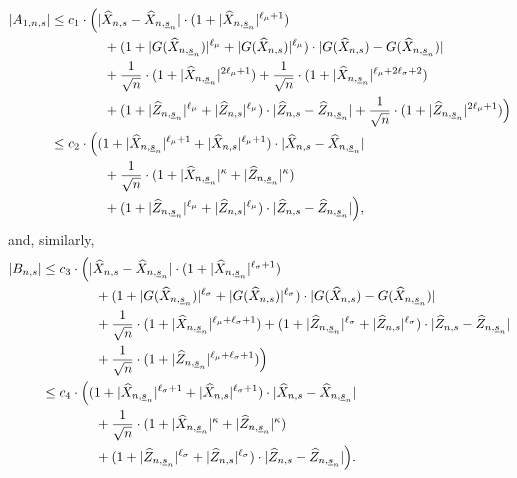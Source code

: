 \documentclass[11pt]{amsart}
\newcommand{\eul}{{\widehat X}}
\newcommand{\eultr}{{\widehat Z}}
\newcommand{\usn}{\underline {s}_n}
\theoremstyle{plain}
\theoremstyle{definition}
\begin{document}
\begin{equation}\label{ana3}
	\begin{aligned}
		|A_{1,n,s}| & \le c_1 \cdot \Bigl(|\eul_{n,s}- \eul_{n,\usn}| \cdot (1+ |\eul_{n,\usn}|^{\ell_\mu+1})\\
		&\qquad\qquad + (1+ |G(\eul_{n,\usn})|^{\ell_\mu}  + |G(\eul_{n,s})|^{\ell_\mu} )\cdot   |G(\eul_{n,s})- G(\eul_{n,\usn})| \\
				& \qquad\qquad + \frac{1}{\sqrt{n}}\cdot( 1+ |\widehat X_{n,\usn}|^{2\ell_\mu+1})  + \frac{1}{\sqrt{n}} \cdot( 1+ |\widehat X_{n,\usn}|^{\ell_\mu+2\ell_\sigma+2}) \\
					& \qquad\qquad +  (1+ |\eultr_{n,\usn}|^{\ell_\mu}  + |\eultr_{n,s}|^{\ell_\mu} )\cdot   |\eultr_{n,s}- \eultr_{n,\usn}|
		+ \frac{1}{\sqrt{n}} \cdot( 1+ |\widehat Z_{n,\usn}|^{2\ell_\mu+1})\Bigr)\\
			& \le c_2\cdot \Bigl((1+ |\eul_{n,\usn}|^{\ell_\mu+1}+ |\eul_{n,s}|^{\ell_\mu+1}   ) \cdot |\eul_{n,s}- \eul_{n,\usn}|  \\
		& \qquad\qquad +	\frac{1}{\sqrt{n}} \cdot( 1+ |\widehat X_{n,\usn}|^{\kappa } + |\widehat Z_{n,\usn}|^{\kappa} ) \\
		& \qquad\qquad +  (1+ |\eultr_{n,\usn}|^{\ell_\mu}  + |\eultr_{n,s}|^{\ell_\mu} )\cdot   |\eultr_{n,s}- \eultr_{n,\usn}| \Bigr),
	\end{aligned}
\end{equation}
and, similarly,
\begin{equation}\label{ana4}
	\begin{aligned}
		|B_{n,s}| & \le c_3 \cdot\Bigl(|\eul_{n,s}- \eul_{n,\usn}| \cdot (1+ |\eul_{n,\usn}|^{\ell_\sigma+1})\\
		&\qquad\qquad + (1+ |G(\eul_{n,\usn})|^{\ell_\sigma}  + |G(\eul_{n,s})|^{\ell_\sigma} )\cdot   |G(\eul_{n,s})- G(\eul_{n,\usn})| \\
		& \qquad\qquad + \frac{1}{\sqrt{n}} \cdot( 1+ |\widehat X_{n,\usn}|^{\ell_\mu + \ell_\sigma+1}) +  (1+ |\eultr_{n,\usn}|^{\ell_\sigma}  + |\eultr_{n,s}|^{\ell_\sigma} )\cdot   |\eultr_{n,s}- \eultr_{n,\usn}|\\
			& \qquad\qquad
		+ \frac{1}{\sqrt{n}} \cdot( 1+ |\widehat Z_{n,\usn}|^{\ell_\mu+\ell_\sigma + 1})\Bigr)\\
		& \le c_4\cdot\Bigl((1+ |\eul_{n,\usn}|^{\ell_\sigma+1}+ |\eul_{n,s}|^{\ell_\sigma+1}   ) \cdot |\eul_{n,s}- \eul_{n,\usn}|  \\
		& \qquad\qquad +	\frac{1}{\sqrt{n}} \cdot( 1+ |\widehat X_{n,\usn}|^{\kappa} + |\widehat Z_{n,\usn}|^{\kappa} ) \\
		& \qquad\qquad +  (1+ |\eultr_{n,\usn}|^{\ell_\sigma}  + |\eultr_{n,s}|^{\ell_\sigma} )\cdot   |\eultr_{n,s}- \eultr_{n,\usn}|\Bigr).
	\end{aligned}
\end{equation}
\end{document}
